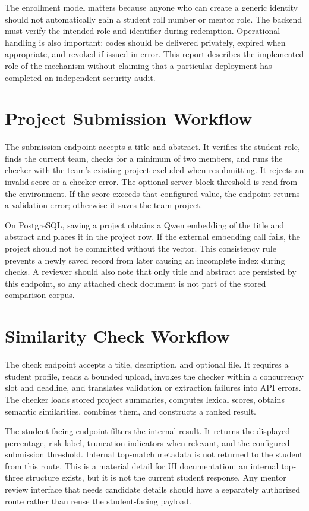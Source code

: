 \documentclass[12pt,a4paper]{report}
\begin{document}
The enrollment model matters because anyone who can create a generic identity should not automatically gain a student roll number or mentor role. The backend must verify the intended role and identifier during redemption. Operational handling is also important: codes should be delivered privately, expired when appropriate, and revoked if issued in error. This report describes the implemented role of the mechanism without claiming that a particular deployment has completed an independent security audit.

\section{Project Submission Workflow}
The submission endpoint accepts a title and abstract. It verifies the student role, finds the current team, checks for a minimum of two members, and runs the checker with the team's existing project excluded when resubmitting. It rejects an invalid score or a checker error. The optional server block threshold is read from the environment. If the score exceeds that configured value, the endpoint returns a validation error; otherwise it saves the team project.

On PostgreSQL, saving a project obtains a Qwen embedding of the title and abstract and places it in the project row. If the external embedding call fails, the project should not be committed without the vector. This consistency rule prevents a newly saved record from later causing an incomplete index during checks. A reviewer should also note that only title and abstract are persisted by this endpoint, so any attached check document is not part of the stored comparison corpus.

\section{Similarity Check Workflow}
The check endpoint accepts a title, description, and optional file. It requires a student profile, reads a bounded upload, invokes the checker within a concurrency slot and deadline, and translates validation or extraction failures into API errors. The checker loads stored project summaries, computes lexical scores, obtains semantic similarities, combines them, and constructs a ranked result.

The student-facing endpoint filters the internal result. It returns the displayed percentage, risk label, truncation indicators when relevant, and the configured submission threshold. Internal top-match metadata is not returned to the student from this route. This is a material detail for UI documentation: an internal top-three structure exists, but it is not the current student response. Any mentor review interface that needs candidate details should have a separately authorized route rather than reuse the student-facing payload.
\end{document}
